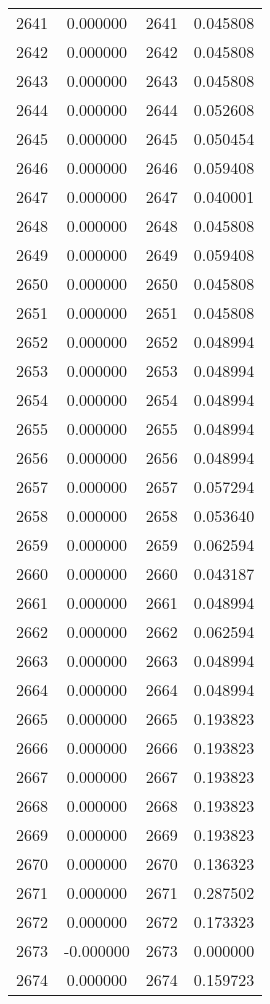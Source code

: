 \documentclass[12pt]{article}
\begin{document}
\begin{longtable}{@{}cccc@{}}
2641 & 0.000000 & 2641 & 0.045808 \\
2642 & 0.000000 & 2642 & 0.045808 \\
2643 & 0.000000 & 2643 & 0.045808 \\
2644 & 0.000000 & 2644 & 0.052608 \\
2645 & 0.000000 & 2645 & 0.050454 \\
2646 & 0.000000 & 2646 & 0.059408 \\
2647 & 0.000000 & 2647 & 0.040001 \\
2648 & 0.000000 & 2648 & 0.045808 \\
2649 & 0.000000 & 2649 & 0.059408 \\
2650 & 0.000000 & 2650 & 0.045808 \\
2651 & 0.000000 & 2651 & 0.045808 \\
2652 & 0.000000 & 2652 & 0.048994 \\
2653 & 0.000000 & 2653 & 0.048994 \\
2654 & 0.000000 & 2654 & 0.048994 \\
2655 & 0.000000 & 2655 & 0.048994 \\
2656 & 0.000000 & 2656 & 0.048994 \\
2657 & 0.000000 & 2657 & 0.057294 \\
2658 & 0.000000 & 2658 & 0.053640 \\
2659 & 0.000000 & 2659 & 0.062594 \\
2660 & 0.000000 & 2660 & 0.043187 \\
2661 & 0.000000 & 2661 & 0.048994 \\
2662 & 0.000000 & 2662 & 0.062594 \\
2663 & 0.000000 & 2663 & 0.048994 \\
2664 & 0.000000 & 2664 & 0.048994 \\
2665 & 0.000000 & 2665 & 0.193823 \\
2666 & 0.000000 & 2666 & 0.193823 \\
2667 & 0.000000 & 2667 & 0.193823 \\
2668 & 0.000000 & 2668 & 0.193823 \\
2669 & 0.000000 & 2669 & 0.193823 \\
2670 & 0.000000 & 2670 & 0.136323 \\
2671 & 0.000000 & 2671 & 0.287502 \\
2672 & 0.000000 & 2672 & 0.173323 \\
2673 & -0.000000 & 2673 & 0.000000 \\
2674 & 0.000000 & 2674 & 0.159723 \\

\end{longtable}
\end{document}
